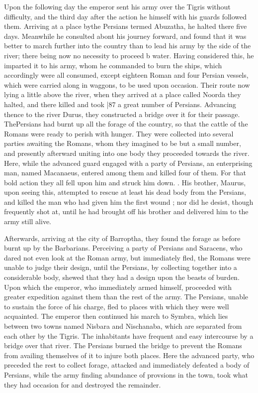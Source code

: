Upon the following day the emperor sent his army over the Tigris without difficulty, and the third day after the action he himself with his guards followed them. Arriving at a place by\emph{}the Persians termed Abuzatha, he halted there five days. Meanwhile he consulted abont his journey forward, and found that it was better to march further into the country than to lead his army by the side of the river; there being now no necessity to proceed b water. Having considered this, he imparted it to his army,
whom he commanded to burn the ships, which accordingly were all consumed, except eighteen Roman and four Persian vessels,
which were carried along in waggons, to be used upon occasion. Their route now lying a little above the river, when they arrived at a place called Noorda they halted, and there killed and took
|87 a great number of Persians. Advancing thence to the river Durus, they constructed a bridge over it for their passage. The\emph{}Persians had burnt up all the forage of the country, so that the cattle of the Romans were ready to perish with hunger. They were collected into several parties awaiting the Romans, whom they imagined to be but a small number, and presently afterward uniting into one body they proceeded towards the river. Here, while the advanced guard engaged with a party of Persians, an enterprising man, named Macanaeus, entered among them and killed four of them. For that bold action they all fell upon him and struck him down. . His brother, Maurus, upon seeing this, attempted to rescue at least his dead body from the Persians, and killed the man who had given him the first wound ; nor did he desist, though frequently shot at, until he had brought off his brother and delivered him to the army still alive.

Afterwards, arriving at the city of Barroptha, they found the forage as before burnt up by the Barbarians. Perceiving a party of Persians and Saracens, who dared not even look at the Roman army, but immediately fled, the Romans were unable to judge their design, until the Persians, by collecting together into a considerable body, shewed that they had a design upon the beasts of burden. Upon which the emperor, who immediately armed himself, proceeded with greater expedition against them than the rest of the army. The Persians, unable to sustain the force of his charge, fled to places with which they were well acquainted. The emperor then continued his march to Symbra, which lies between two towns named Nisbara and Nischanaba, which are separated from each other by the Tigris. The inhabitants have frequent and easy intercourse by a bridge over that river. The Persians burned the bridge to prevent the Romans from availing themselves of it to injure both places. Here the advanced party, who preceded the rest to collect forage, attacked and immediately defeated a body of Persians, while the army finding abundance of provsions in the town, took what they had occasion for and destroyed the remainder.

